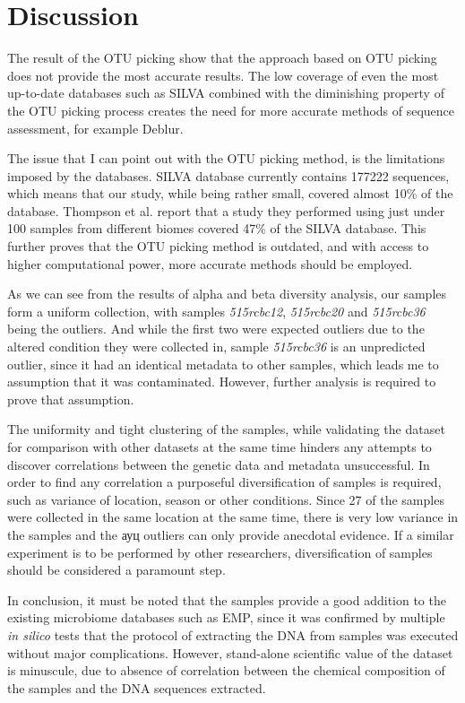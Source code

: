 \documentclass[12pt,twocolumn]{article} %
\begin{document}
\section{Discussion}
The result of the OTU picking show that the approach based on OTU picking does not provide the most accurate results. The low coverage of even the most up-to-date databases such as SILVA combined with the diminishing property of the OTU picking process creates the need for more accurate methods of sequence assessment, for example Deblur\cite{Amir}.
\par
The issue that I can point out with the OTU picking method, is the limitations imposed by the databases. SILVA database currently contains 177222 sequences, which means that our study, while being rather small, covered almost 10\% of the database. Thompson et al.\cite{Thompson2017} report that a study they performed using just under 100 samples from different biomes covered  47\% of the SILVA database. This further proves that the OTU picking method is outdated, and with access to higher computational power, more accurate methods should be employed.
\par
As we can see from the results of alpha and beta diversity analysis, our samples form a uniform collection, with samples \textit{515rcbc12}, \textit{515rcbc20} and \textit{515rcbc36} being the outliers. And while the first two were expected outliers due to the altered condition they were collected in, sample \textit{515rcbc36} is an unpredicted outlier, since it had an identical metadata to other samples, which leads me to assumption that it was contaminated. However, further analysis is required to prove that assumption.
\par
The uniformity and tight clustering of the samples, while validating the dataset for comparison with other datasets at the same time hinders any attempts to discover correlations between the genetic data and metadata unsuccessful. In order to find any correlation a purposeful diversification of samples is required, such as variance of location, season or other conditions. Since 27 of the samples were collected in the same location at the same time, there is very low variance in the samples and the ауц outliers can only provide anecdotal evidence. If a similar experiment is to be performed by other researchers, diversification of samples should be considered a paramount step.
\par
In conclusion, it must be noted that the samples provide a good addition to the existing microbiome databases such as EMP, since it was confirmed by multiple \textit{in silico} tests that the protocol of extracting the DNA from samples was executed without major complications. However, stand-alone scientific value of the dataset is minuscule, due to absence of correlation between the chemical composition of the samples and the DNA sequences extracted. 
 


\newpage

\end{document}
